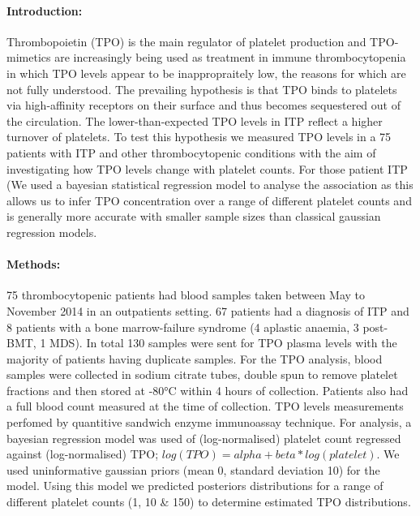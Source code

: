\documentclass[11pt]{article}
\title{}
\author{George Adams .... Nichola Cooper}
\date{July 2018}
\begin{document}
\maketitle

\paragraph{Introduction:} Thrombopoietin (TPO) is the main regulator of platelet production and TPO-mimetics are increasingly being used as treatment in immune thrombocytopenia in which TPO levels appear to be inappropraitely low, the reasons for which are not fully understood. The prevailing hypothesis is that TPO binds to platelets via high-affinity receptors on their surface and thus becomes sequestered out of the circulation. The lower-than-expected TPO levels in ITP reflect a higher turnover of platelets. To test this hypothesis we measured TPO levels in a 75 patients with ITP and other thrombocytopenic conditions with the aim of investigating how TPO levels change with platelet counts. For those patient ITP (We used a bayesian statistical regression model to analyse the association as this allows us to infer TPO concentration over a range of different platelet counts and is generally more accurate with smaller sample sizes than classical gaussian regression models.


\paragraph{Methods:} 75 thrombocytopenic patients had blood samples taken between May to November 2014 in an outpatients setting. 67 patients had a diagnosis of ITP and 8 patients with a bone marrow-failure syndrome (4 aplastic anaemia, 3 post- BMT, 1 MDS). In total 130 samples were sent for TPO plasma levels with the majority of patients having duplicate samples. For the TPO analysis, blood samples were collected in sodium citrate tubes, double spun to remove platelet fractions and then stored at -80°C within 4 hours of collection. Patients also had a full blood count measured at the time of collection. TPO levels measurements perfomed by quantitive sandwich enzyme immunoassay technique. For analysis, a bayesian regression model was used of (log-normalised) platelet count regressed against (log-normalised) TPO; $log(TPO) = alpha + beta*log(platelet)$. We used uninformative gaussian priors (mean 0, standard deviation 10) for the model. Using this model we predicted posteriors distributions for a range of different platelet counts (1, 10 & 150) to determine estimated TPO distributions.
\end{document}

